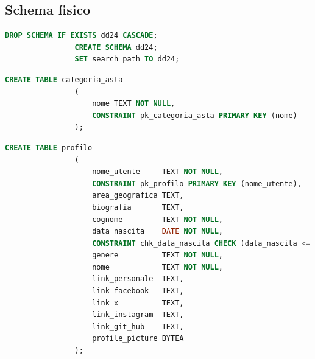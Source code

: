         \clearpage
        
        \subsection{Schema fisico}
            \begin{lstlisting}[language=SQL, caption=Preparazione ambiente]
                DROP SCHEMA IF EXISTS dd24 CASCADE;
                CREATE SCHEMA dd24;
                SET search_path TO dd24;
            \end{lstlisting}
                        
            \begin{lstlisting}[language=SQL, caption=Relazione categoria asta]
                CREATE TABLE categoria_asta
                (
                    nome TEXT NOT NULL,
                    CONSTRAINT pk_categoria_asta PRIMARY KEY (nome)
                );
            \end{lstlisting}
            
            \begin{lstlisting}[language=SQL, caption=Relazione profilo]
                CREATE TABLE profilo
                (
                    nome_utente     TEXT NOT NULL,
                    CONSTRAINT pk_profilo PRIMARY KEY (nome_utente),
                    area_geografica TEXT,
                    biografia       TEXT,
                    cognome         TEXT NOT NULL,
                    data_nascita    DATE NOT NULL,
                    CONSTRAINT chk_data_nascita CHECK (data_nascita <= NOW()),
                    genere          TEXT NOT NULL,
                    nome            TEXT NOT NULL,
                    link_personale  TEXT,
                    link_facebook   TEXT,
                    link_x          TEXT,
                    link_instagram  TEXT,
                    link_git_hub    TEXT,
                    profile_picture BYTEA
                );
            \end{lstlisting}
            
